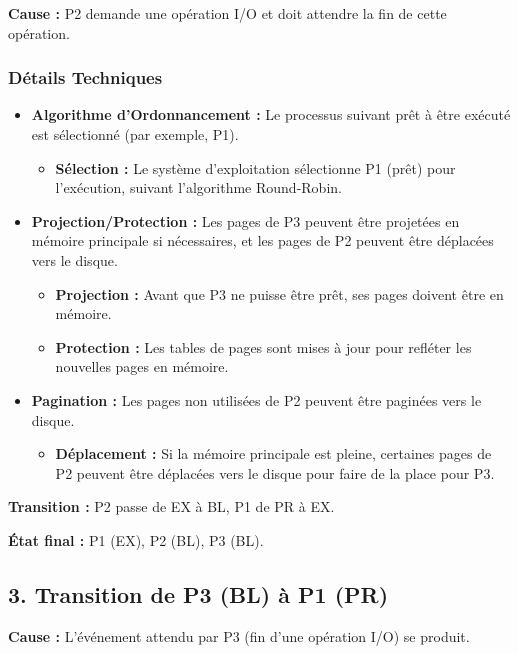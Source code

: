 \textbf{Cause :} P2 demande une opération I/O et doit attendre la fin de cette opération.

\subsubsection*{Détails Techniques}

\begin{itemize}
    \item \textbf{Algorithme d'Ordonnancement :} Le processus suivant prêt à être exécuté est sélectionné (par exemple, P1).
    \begin{itemize}
        \item \textbf{Sélection :} Le système d'exploitation sélectionne P1 (prêt) pour l'exécution, suivant l'algorithme Round-Robin.
    \end{itemize}
    \item \textbf{Projection/Protection :} Les pages de P3 peuvent être projetées en mémoire principale si nécessaires, et les pages de P2 peuvent être déplacées vers le disque.
    \begin{itemize}
        \item \textbf{Projection :} Avant que P3 ne puisse être prêt, ses pages doivent être en mémoire.
        \item \textbf{Protection :} Les tables de pages sont mises à jour pour refléter les nouvelles pages en mémoire.
    \end{itemize}
    \item \textbf{Pagination :} Les pages non utilisées de P2 peuvent être paginées vers le disque.
    \begin{itemize}
        \item \textbf{Déplacement :} Si la mémoire principale est pleine, certaines pages de P2 peuvent être déplacées vers le disque pour faire de la place pour P3.
    \end{itemize}
\end{itemize}

\textbf{Transition :} P2 passe de EX à BL, P1 de PR à EX.

\textbf{État final :} P1 (EX), P2 (BL), P3 (BL).

\subsection*{3. Transition de P3 (BL) à P1 (PR)}

\textbf{Cause :} L'événement attendu par P3 (fin d'une opération I/O) se produit.

